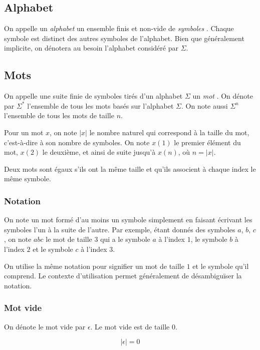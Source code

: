 \subsection{Alphabet}

On appelle un \og \textit{alphabet} \fg{} un ensemble finis et non-vide de \og \textit{symboles} \fg{}.
Chaque symbole est distinct des autres symboles de l'alphabet.
Bien que généralement implicite, on dénotera au besoin l'alphabet considéré par $\Sigma$.

\subsection{Mots}

On appelle une suite finie de symboles tirés d'un alphabet $\Sigma$ un \og \textit{mot} \fg{}.
On dénote par $\Sigma^*$ l'ensemble de tous les mots basés sur l'alphabet $\Sigma$.
On note aussi $\Sigma^n$ l'ensemble de tous les mots de taille $n$.

Pour un mot $x$, on note $|x|$ le nombre naturel qui correspond à la taille du mot, c'est-à-dire à son nombre de symboles.
On note $x(1)$ le premier élément du mot, $x(2)$ le deuxième, et ainsi de suite jusqu'à $x(n)$, où $n = |x|$.

Deux mots sont égaux s'ils ont la même taille et qu'ils associent à chaque index le même symbole.

\subsubsection{Notation}

On note un mot formé d'au moins un symbole simplement en faisant écrivant les symboles l'un à la suite de l'autre.
Par exemple, étant donnés des symboles $a$, $b$, $c$, on note $abc$ le mot de taille $3$ qui a le symbole $a$ à l'index $1$, le symbole $b$ à l'index $2$ et le symbole $c$ à l'index $3$.

On utilise la même notation pour signifier un mot de taille $1$ et le symbole qu'il comprend.
Le contexte d'utilisation permet généralement de désambiguïser la notation. 

\subsubsection{Mot vide}

On dénote le mot vide par $\epsilon$.
Le mot vide est de taille $0$.

\[
|\epsilon| = 0
\]

